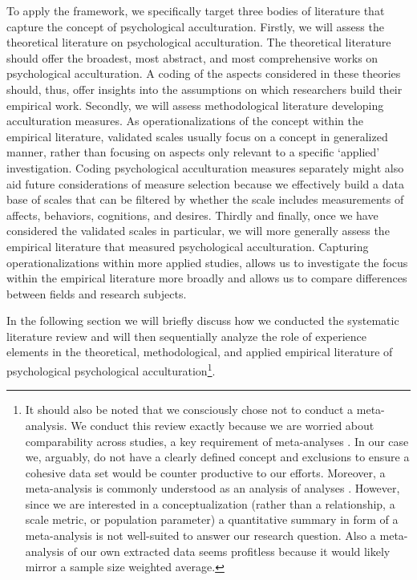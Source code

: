 \documentclass[man, 12pt, a4paper]{apa7}
\begin{document}
To apply the framework, we specifically target three bodies of literature that capture the concept of psychological acculturation. Firstly, we will assess the theoretical literature on psychological acculturation. The theoretical literature should offer the broadest, most abstract, and most comprehensive works on psychological acculturation. A coding of the aspects considered in these theories should, thus, offer insights into the assumptions on which researchers build their empirical work.
Secondly, we will assess methodological literature developing acculturation measures. As operationalizations of the concept within the empirical literature, validated scales usually focus on a concept in generalized manner, rather than focusing on aspects only relevant to a specific `applied' investigation. Coding psychological acculturation measures separately might also aid future considerations of measure selection because we effectively build a data base of scales that can be filtered by whether the scale includes measurements of affects, behaviors, cognitions, and desires. 
Thirdly and finally, once we have considered the validated scales in particular, we will more generally assess the empirical literature that measured psychological acculturation. Capturing operationalizations within more applied studies, allows us to investigate the focus within the empirical literature more broadly and allows us to compare differences between fields and research subjects.

In the following section we will briefly discuss how we conducted the systematic literature review and will then sequentially analyze the role of experience elements in the theoretical, methodological, and applied empirical literature of psychological psychological acculturation\footnote{It should also be noted that we consciously chose not to conduct a meta-analysis. We conduct this review exactly because we are worried about comparability across studies, a key requirement of meta-analyses \citep{Pogue1998}. In our case we, arguably, do not have a clearly defined concept and exclusions to ensure a cohesive data set would be counter productive to our efforts. Moreover, a meta-analysis is commonly understood as an analysis of analyses \citep{Glass1976}. However, since we are interested in a conceptualization (rather than a relationship, a scale metric, or population parameter) a quantitative summary in form of a meta-analysis is not well-suited to answer our research question. Also a meta-analysis of our own extracted data seems profitless because it would likely mirror a sample size weighted average.}.
\end{document}
